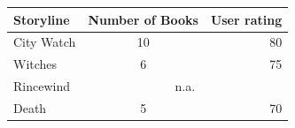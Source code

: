 \begin{tabular}{lcr}
	Storyline & Number of Books & User rating \\ \hline
	City Watch & 10 & 80 \\ 
	Witches & 6 & 75 \\
	Rincewind & \multicolumn{2}{c}{n.a.} \\
	Death & 5 & 70\\
\end{tabular}



